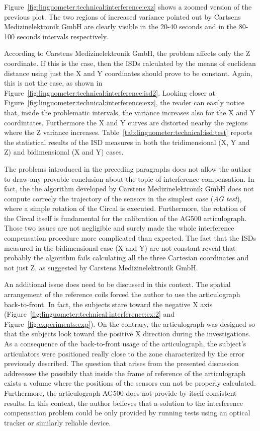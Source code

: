 Figure~\ref{fig:linguometer:technical:interference:exz} shows a zoomed version
of the previous plot. 
The two regions of increased variance pointed out by Cartsens Medizinelektronik
GmbH are clearly visible in the 20-40 seconds and in the 80-100 seconds
intervals respectively.


According to Carstens Medizinelektronik GmbH, the problem affects only the Z
coordinate. If this is the case, then the ISDs calculated by the means of
euclidean distance using just the X and Y coordinates should prove to be
constant.
Again, this is not the case, as shown in 
Figure~\ref{fig:linguometer:technical:interference:isd2}.
Looking closer at Figure~\ref{fig:linguometer:technical:interference:exz}, the
reader can easily notice that, inside the problematic intervals, the variance 
increases also for the X and Y coordintates. Furthermore the X and Y curves are
distorted nearby the regions where the Z variance increases.
Table~\ref{tab:linguometer:technical:isd:test} reports the statistical results
of the ISD measures in both the tridimensional (X, Y and Z) and bidimensional
(X and Y) cases.

The problems introduced in the preceding paragraphs does not allow the author to
draw any provable conclusion about the topic of interference compensation.
In fact, the the algorithm developed by Carstens Medizinelektronik GmbH 
does not compute correcly the trajectory of the sensors in the simplest case 
(\emph{AG test}), where a simple rotation of the Circal is executed. 
Furthermore, the rotation of the Circal itself is fundamental for the
calibration of the AG500 articulograph. Those two issues are not negligible and
surely made the whole interference compensation procedure more complicated than
expected.
The fact that the ISDs measured in the bidimensional case (X and Y) are not
constant reveal that probably the algorithm fails calculating all the three
Cartesian coordinates and not just Z, as suggested by Carstens
Medizinelektronik GmbH.


An additional issue does need to be discussed in this context. 
The spatial arrangement of the reference coils forced the author to use the
articulograph back-to-front.
In fact, the subjects stare toward the negative X
axis (Figure~\ref{fig:linguometer:technical:interference:ex:2} and
Figure~\ref{fig:experiments:exp}).
On the contrary, the articulograph was designed so that the subjects look
toward the positive X direction during the investigations.
As a consequence of the back-to-front usage of the articulograph,
the subject's articulators were positioned really close to the zone
characterized by the error previously described.
The question that arises from the presented discussion addreessee the possibily
that inside the frame of reference of the articulograph exists a volume where
the positions of the sensors can not be properly calculated.
Furthermore, the articulograph AG500 does not provide by itself consistent
results. In this context, the author believes that a solution to the
interference compensation problem could be only provided by running tests using
an optical tracker or similarly reliable device.


